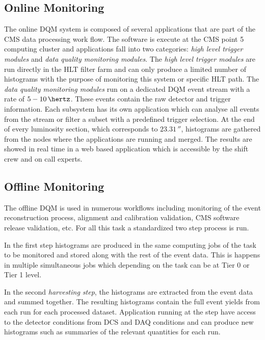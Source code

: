 \subsection{Online Monitoring}


The online \gls{DQM} system is composed of several applications that are part of the \gls{CMS} data processing work flow. The software is execute at the \gls{CMS} point 5 computing cluster and applications fall into two categories: \textit{high level trigger modules} and \textit{data quality monitoring modules}. The \textit{high level trigger modules} are run directly in the \gls{HLT} filter farm and can only produce a limited number of histograms with the purpose of monitoring this system or specific \gls{HLT} path. The \textit{data quality monitoring modules} run on a dedicated \gls{DQM} event stream with a rate of $5-10\,\hertz$. These events contain the raw detector and trigger information. Each subsystem has its own application which can analyse all events from the stream or filter a subset with a predefined trigger selection. At the end of every luminosity section, which corresponds to $23.31\,\second$, histograms are gathered from the nodes where the applications are running and merged. The results are showed in real time in a web based application which is accessible by the shift crew and on call experts.

\subsection{Offline Monitoring}


The offline \gls{DQM} is used in numerous workflows including monitoring of the event reconstruction process, alignment and calibration validation, \gls{CMS} software release validation, etc. For all this task a standardized two step process is run. 

In the first step histograms are produced in the same computing jobs of the task to be monitored and stored along with the rest of the event data. This is happens in multiple simultaneous jobs which depending on the task can be at Tier 0 or Tier 1 level.

In the second \textit{harvesting step}, the histograms are extracted from the event data and summed together. The resulting histograms contain the full event yields from each run for each processed dataset. Application running at the step have access to the detector conditions from \gls{DCS} and \gls{DAQ} conditions and can produce new histograms such as summaries of the relevant quantities for each run.

